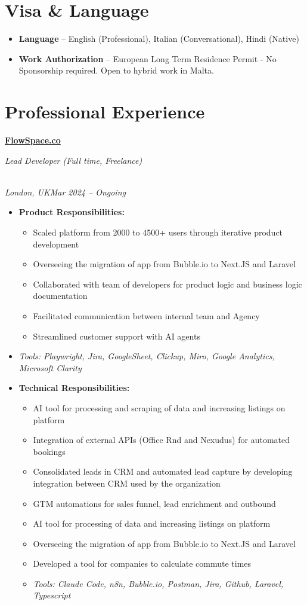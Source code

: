 \documentclass[a4paper,10pt]{article}
\newcommand{\role}[4]{\vspace{3pt}\noindent\hspace{0.6em}\parbox[t]{0.38\textwidth}{\raggedright\textbf{#1}}\hfill\parbox[t]{0.58\textwidth}{\raggedleft\textit{#2}}\\{\textit{#3}\hfill\textit{#4}}\vspace{1pt}}
\begin{document}
\section{Visa \& Language}
\begin{itemize}
\item \textbf{Language} -- English (Professional), Italian (Conversational), Hindi (Native)
\item \textbf{Work Authorization} -- European Long Term Residence Permit - No Sponsorship required. Open to hybrid work in Malta.
\end{itemize}

\section{Professional Experience}
\role{\href{https://flowspace.co}{FlowSpace.co}}{Lead Developer (Full time, Freelance)}{London, UK}{Mar 2024 -- Ongoing}
\begin{itemize}
\item \textbf{Product Responsibilities:}
\begin{itemize}[label=--]
\item Scaled platform from 2000 to 4500+ users through iterative product development
\item Overseeing the migration of app from Bubble.io to Next.JS and Laravel
\item Collaborated with team of developers for product logic and business logic documentation
\item Facilitated communication between internal team and Agency
\item Streamlined customer support with AI agents
\end{itemize}
\item \textit{Tools: Playwright, Jira, GoogleSheet, Clickup, Miro, Google Analytics, Microsoft Clarity}
\item \textbf{Technical Responsibilities:}
\begin{itemize}[label=--]
\item AI tool for processing and scraping of data and increasing listings on platform
\item Integration of external APIs (Office Rnd and Nexudus) for automated bookings
\item Consolidated leads in CRM and automated lead capture by developing integration between CRM used by the organization
\item GTM automations for sales funnel, lead enrichment and outbound
\item AI tool for processing of data and increasing listings on platform
\item Overseeing the migration of app from Bubble.io to Next.JS and Laravel
\item Developed a tool for companies to calculate commute times
\item \textit{Tools: Claude Code, n8n, Bubble.io, Postman, Jira, Github, Laravel, Typescript}
\end{itemize}
\end{itemize}
\end{document}
